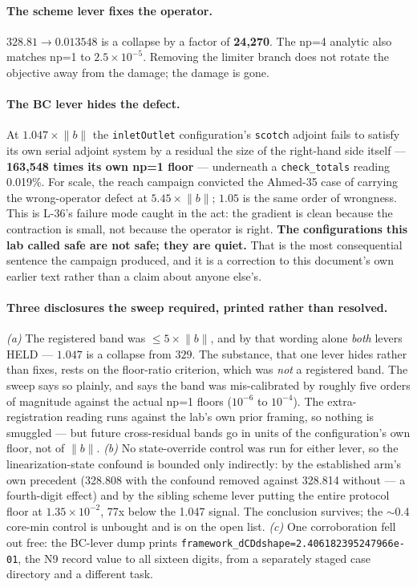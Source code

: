\documentclass[11pt,a4paper]{article}
\begin{document}
\paragraph{The scheme lever fixes the operator.} \(328.81 \rightarrow 0.013548\) is a
collapse by a factor of \textbf{24{,}270}. The np=4 analytic also matches np=1 to
\(2.5\times10^{-5}\). Removing the limiter branch does not rotate the objective away from the
damage; the damage is gone.

\paragraph{The BC lever hides the defect.} At \(1.047\times\lVert b\rVert\) the
\texttt{inletOutlet} configuration's \texttt{scotch} adjoint fails to satisfy its own serial
adjoint system by a residual the size of the right-hand side itself --- \textbf{163{,}548
times its own np=1 floor} --- underneath a \texttt{check\_totals} reading 0.019\%. For scale,
the reach campaign convicted the Ahmed-35 case of carrying the wrong-operator defect at
\(5.45\times\lVert b\rVert\); \(1.05\) is the same order of wrongness. This is L-36's failure
mode caught in the act: the gradient is clean because the contraction is small, not because
the operator is right. \textbf{The configurations this lab called safe are not safe; they are
quiet.} That is the most consequential sentence the campaign produced, and it is a correction
to this document's own earlier text rather than a claim about anyone else's.

\paragraph{Three disclosures the sweep required, printed rather than resolved.} \emph{(a)}
The registered band was \(\le 5\times\lVert b\rVert\), and by that wording alone \emph{both}
levers HELD --- \(1.047\) is a collapse from \(329\). The substance, that one lever hides
rather than fixes, rests on the floor-ratio criterion, which was \emph{not} a registered band.
The sweep says so plainly, and says the band was mis-calibrated by roughly five orders of
magnitude against the actual np=1 floors (\(10^{-6}\) to \(10^{-4}\)). The extra-registration
reading runs against the lab's own prior framing, so nothing is smuggled --- but future
cross-residual bands go in units of the configuration's own floor, not of \(\lVert b\rVert\).
\emph{(b)} No state-override control was run for either lever, so the
linearization-state confound is bounded only indirectly: by the established arm's own
precedent (328.808 with the confound removed against 328.814 without --- a fourth-digit
effect) and by the sibling scheme lever putting the entire protocol floor at
\(1.35\times10^{-2}\), 77x below the 1.047 signal. The conclusion survives; the
\(\sim\)0.4 core-min control is unbought and is on the open list. \emph{(c)} One
corroboration fell out free: the BC-lever dump prints
\texttt{framework\_dCDdshape=2.406182395247966e-01}, the N9 record value to all sixteen
digits, from a separately staged case directory and a different task.
\end{document}

